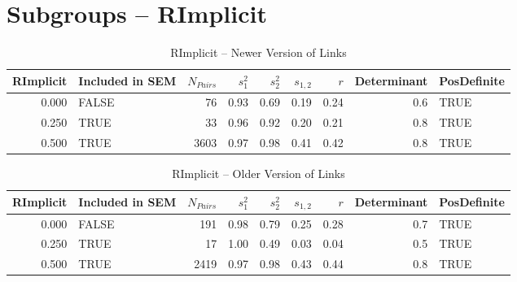 \documentclass{article}\usepackage[]{graphicx}\usepackage[]{color}
\begin{document}
\section{Subgroups --  RImplicit }%
\begin{table}[ht]
\centering
\begin{tabular}{rlrrrrrrl}
  \hline
RImplicit & Included in SEM & $N_{Pairs}$ & $s_1^2$ & $s_2^2$ & $s_{1,2}$ & $r$ & Determinant & PosDefinite \\ 
  \hline
0.000 & FALSE & 76 & 0.93 & 0.69 & 0.19 & 0.24 & 0.6 & TRUE \\ 
  0.250 & TRUE & 33 & 0.96 & 0.92 & 0.20 & 0.21 & 0.8 & TRUE \\ 
  0.500 & TRUE & 3603 & 0.97 & 0.98 & 0.41 & 0.42 & 0.8 & TRUE \\ 
   \hline
\end{tabular}
\caption{RImplicit -- Newer Version of Links} 
\end{table}
\begin{table}[ht]
\centering
\begin{tabular}{rlrrrrrrl}
  \hline
RImplicit & Included in SEM & $N_{Pairs}$ & $s_1^2$ & $s_2^2$ & $s_{1,2}$ & $r$ & Determinant & PosDefinite \\ 
  \hline
0.000 & FALSE & 191 & 0.98 & 0.79 & 0.25 & 0.28 & 0.7 & TRUE \\ 
  0.250 & TRUE & 17 & 1.00 & 0.49 & 0.03 & 0.04 & 0.5 & TRUE \\ 
  0.500 & TRUE & 2419 & 0.97 & 0.98 & 0.43 & 0.44 & 0.8 & TRUE \\ 
   \hline
\end{tabular}
\caption{RImplicit -- Older Version of Links} 
\end{table}
\end{document}
